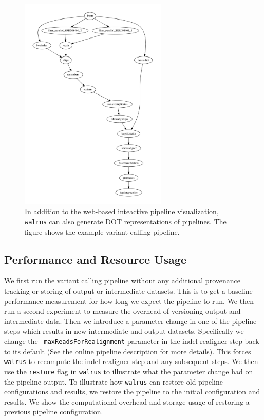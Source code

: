 \begin{figure}
\includegraphics[width=7cm]{figures/graph.pdf}
    \caption{In addition to the web-based inteactive pipeline visualization,
    \texttt{walrus} can also generate DOT representations of pipelines. The
    figure shows the example variant calling pipeline.} 
    \label{benchpipefigure}
\end{figure} 

\subsection{Performance and Resource Usage}
We first run the variant calling pipeline without any additional provenance
tracking or storing of output or intermediate datasets. This is to get a
baseline performance measurement for how long we expect the pipeline to run. We
then run a second experiment to measure the overhead of versioning output and
intermediate data. Then we introduce a parameter change in one of the pipeline
steps which results in new intermediate and output datasets. Specifically we
change the \texttt{--maxReadsForRealignment} parameter in the indel realigner
step back to its default (See the online pipeline description for more details).
This forces \texttt{walrus} to recompute the indel realigner step and any
subsequent steps. We then use the \texttt{restore} flag in \texttt{walrus} to
illustrate what the parameter change had on the pipeline output.  To illustrate
how \texttt{walrus} can restore old pipeline configurations and results, we
restore the pipeline to the initial configuration and results. We show the
computational overhead and storage usage of restoring a previous pipeline
configuration. 

